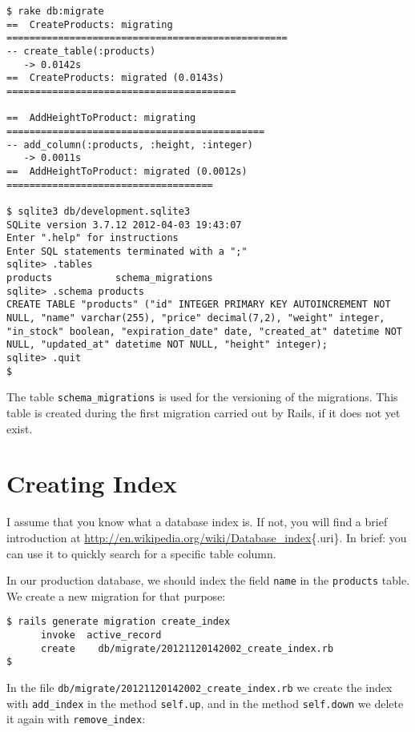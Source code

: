 \documentclass[a4paper]{book}
\newcounter{tab}[chapter]
\begin{document}
\begin{shaded}\begin{verbatim}
$ rake db:migrate
==  CreateProducts: migrating =================================================
-- create_table(:products)
   -> 0.0142s
==  CreateProducts: migrated (0.0143s) ========================================

==  AddHeightToProduct: migrating =============================================
-- add_column(:products, :height, :integer)
   -> 0.0011s
==  AddHeightToProduct: migrated (0.0012s) ====================================

$ sqlite3 db/development.sqlite3
SQLite version 3.7.12 2012-04-03 19:43:07
Enter ".help" for instructions
Enter SQL statements terminated with a ";"
sqlite> .tables
products           schema_migrations
sqlite> .schema products
CREATE TABLE "products" ("id" INTEGER PRIMARY KEY AUTOINCREMENT NOT NULL, "name" varchar(255), "price" decimal(7,2), "weight" integer, "in_stock" boolean, "expiration_date" date, "created_at" datetime NOT NULL, "updated_at" datetime NOT NULL, "height" integer);
sqlite> .quit
$
\end{verbatim}\end{shaded}

The table \texttt{schema\_migrations} is used for the versioning of the migrations. This table is created during the first migration carried out by Rails, if it does not yet exist.

\section{Creating Index}\label{creating-index}

I assume that you know what a database index is. If not, you will find a brief introduction at \url{http://en.wikipedia.org/wiki/Database_index}\{.uri\}. In brief: you can use it to quickly search for a specific table column.

In our production database, we should index the field \texttt{name} in the \texttt{products} table. We create a new migration for that purpose:

\begin{shaded}\begin{verbatim}
$ rails generate migration create_index
      invoke  active_record
      create    db/migrate/20121120142002_create_index.rb
$
\end{verbatim}\end{shaded}

In the file \texttt{db/migrate/20121120142002\_create\_index.rb} we create the index with \texttt{add\_index} in the method \texttt{self.up}, and in the method \texttt{self.down} we delete it again with \texttt{remove\_index}:
\end{document}
